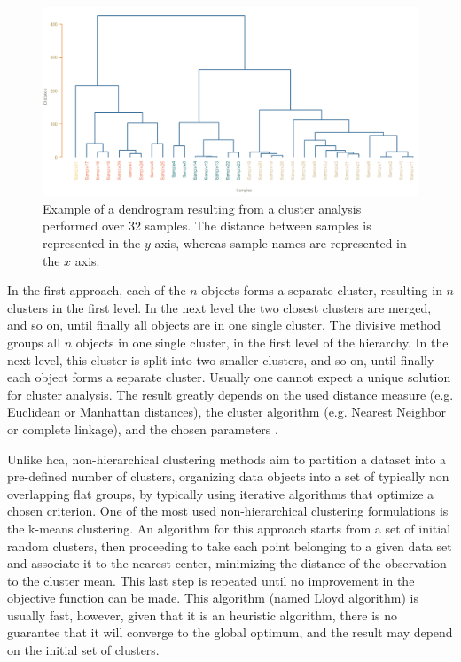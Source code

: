\begin{figure}
	\centering
	\includegraphics[width=1\linewidth]{Imagens/clustering}
	\caption{Example of a dendrogram resulting from a cluster analysis performed over 32 samples. The distance between samples is represented in the $ y $ axis, whereas sample names are represented in the $ x $ axis.}
	\label{clustering}
\end{figure}


In the first approach, each of the $ n $ objects forms a separate cluster, resulting in $ n $ clusters in the first level. In the next level the two closest clusters are merged, and so on, until finally all objects are in one single cluster. The divisive method groups all $ n $ objects in one single cluster, in the first level of the hierarchy. In the next level, this cluster is split into two smaller clusters, and so on, until finally each object forms a separate cluster. Usually one cannot expect a unique solution for cluster analysis. The result greatly depends on the used distance measure (e.g. Euclidean or Manhattan distances), the cluster algorithm (e.g. Nearest Neighbor or complete linkage), and the chosen parameters \citep{varmuza2009introduction}.

Unlike \gls{hca}, non-hierarchical clustering methods aim to partition a dataset into a pre-defined number of clusters, organizing data objects into a set of typically non overlapping flat groups, by typically using iterative algorithms that optimize a chosen criterion. One of the most used non-hierarchical clustering formulations is the k-means clustering. An algorithm for this approach starts from a set of initial random clusters, then proceeding to take each point belonging  to a  given data set and associate it to the nearest center, minimizing the distance of the observation to the cluster mean. This last step is repeated until no improvement in the objective function can be made. This algorithm (named Lloyd algorithm) is usually fast, however, given that it is an heuristic algorithm, there is no guarantee that it will converge to the global optimum, and the result may depend on the initial set of clusters.




